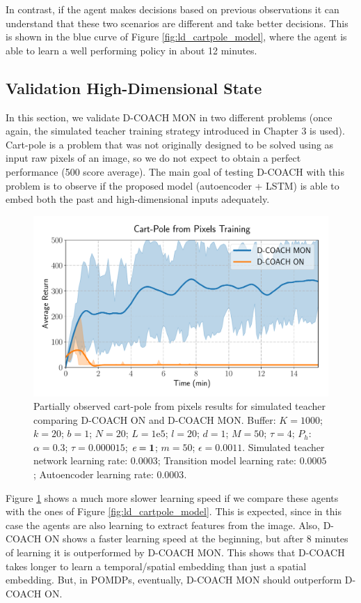 In contrast, if the agent makes decisions based on previous observations it can understand that these two scenarios are different and take better decisions. This is shown in the blue curve of Figure \ref{fig:ld_cartpole_model}, where the agent is able to learn a well performing policy in about 12 minutes. 

\subsection{Validation High-Dimensional State}
In this section, we validate D-COACH MON in two different problems (once again, the simulated teacher training strategy introduced in Chapter 3 is used). Cart-pole is a problem that was not originally designed to be solved using as input raw pixels of an image, so we do not expect to obtain a perfect performance (500 score average). The main goal of testing D-COACH with this problem is to observe if the proposed model (autoencoder + LSTM) is able to embed both the past and high-dimensional inputs adequately.

\begin{figure}[h]
    \centering
    \includegraphics[width=0.7\linewidth]{imagenes/cap3/cartpole_HD_model.pdf}
    \caption[Partially observed Cart-Pole from pixels results for simulated teacher comparing D-COACH ON and D-COACH MON.]{Partially observed cart-pole from pixels results for simulated teacher comparing D-COACH ON and D-COACH MON.  Buffer: $K = 1000$; $k=20$; $b = 1$; $N = 20$; $L=1\mathrm{e}5$; $l=20$; $d=1$; $M=50$; $\tau=4$; $P_{h}$: $\alpha = 0.3$; $\tau = 0.000015$; $\emph{e}=\textbf{1}$; $m=50$; $\epsilon=0.0011$. Simulated teacher network learning rate: $0.0003$; Transition model learning rate: $0.0005$; Autoencoder learning rate: $0.0003$.}
    \label{fig:cp_hd}
\end{figure}

Figure \ref{fig:cp_hd} shows a much more slower learning speed if we compare these agents with the ones of Figure \ref{fig:ld_cartpole_model}. This is expected, since in this case the agents are also learning to extract features from the image. Also, D-COACH ON shows a faster learning speed at the beginning, but after 8 minutes of learning it is outperformed by D-COACH MON. This shows that D-COACH takes longer to learn a temporal/spatial embedding than just a spatial embedding. But, in POMDPs, eventually, D-COACH MON should outperform D-COACH ON.

